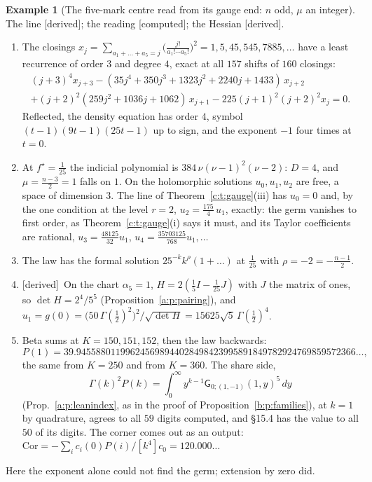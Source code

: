 \documentclass[11pt]{article}
\newcommand{\sG}{\mathsf G}
\theoremstyle{plain}
\theoremstyle{definition}
\newtheorem{example}[proposition]{Example}
\theoremstyle{remark}
\newcommand{\derived}{\textup{[derived]}}
\newcommand{\computed}{\textup{[computed]}}
\begin{document}
\begin{example}[The five-mark centre read from its gauge end: $n$ odd, $\mu$ an integer]\label{c:e:fivegauge}\label{d:e:five}The line \derived; the reading \computed; the Hessian \derived.\
\begin{enumerate}[label=(\roman*)]
\item The closings $x_j=\sum_{a_1+\dots+a_5=j}\big(\frac{j!}{a_1!\cdots a_5!}\big)^2=1,5,45,545,7885,\dots$ have a least recurrence of order $3$ and degree $4$, exact at all $157$ shifts of $160$ closings:
\begin{multline*}
(j+3)^4x_{j+3}-(35j^4+350j^3+1323j^2+2240j+1433)\,x_{j+2}\\
+(j+2)^2(259j^2+1036j+1062)\,x_{j+1}-225(j+1)^2(j+2)^2x_j=0 .
\end{multline*}
Reflected, the density equation has order $4$, symbol $(t-1)(9t-1)(25t-1)$ up to sign, and the exponent $-1$ four times at $t=0$.
\item At $f^\star=\frac1{25}$ the indicial polynomial is $384\,\nu(\nu-1)^2(\nu-2)$: $D=4$, and $\mu=\frac{n-3}2=1$ falls on $1$. On the holomorphic solutions $u_0,u_1,u_2$ are free, a space of dimension $3$. The line of Theorem~\ref{c:t:gauge}(iii) has $u_0=0$ and, by the one condition at the level $r=2$, $u_2=\frac{175}4\,u_1$, exactly: the germ vanishes to first order, as Theorem~\ref{c:t:gauge}(i) says it must, and its Taylor coefficients are rational, $u_3=\frac{48125}{32}u_1$, $u_4=\frac{35703125}{768}u_1,\dots$
\item The law has the formal solution $25^{-k}k^{\rho}(1+\dots)$ at $\frac1{25}$ with $\rho=-2=-\frac{n-1}2$.
\item \derived\ On the chart $\alpha_5=1$, $H=2(\frac15I-\frac1{25}J)$ with $J$ the matrix of ones, so $\det H=2^4/5^5$ (Proposition~\ref{a:p:pairing}), and $u_1=g(0)=\big(50\,\Gamma(\frac12)^2\big)^2/\sqrt{\det H}=15625\sqrt5\,\Gamma(\frac12)^4$.
\item Beta sums at $K=150,151,152$, then the law backwards:
\[
P(1)=39.945588011996245698944028498423995891849782924769859572366\ldots,
\]
the same from $K=250$ and from $K=360$. The share side,
\[
\Gamma(k)^2P(k)=\int_0^\infty y^{k-1}\sG_{0;(1,-1)}(1,y)^5\,dy
\]
(Prop.~\ref{a:p:leanindex}, as in the proof of Proposition~\ref{b:p:families}), at $k=1$ by quadrature, agrees to all $59$ digits computed, and \S15.4 has the value to all $50$ of its digits. The corner comes out as an output: $\mathrm{Cor}=-\sum_ic_i(0)P(i)/[k^4]c_0=120.000\ldots$
\end{enumerate}
Here the exponent alone could not find the germ; extension by zero did.
\end{example}
\end{document}
